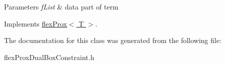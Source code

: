 \begin{DoxyParams}{Parameters}
{\em f\+List} & data part of term \\
\hline
\end{DoxyParams}


Implements \hyperlink{classflex_prox_aec433ffbf1a7586f26a2116c6b94bdd6}{flex\+Prox$<$ T $>$}.



The documentation for this class was generated from the following file\+:\begin{DoxyCompactItemize}
\item 
flex\+Prox\+Dual\+Box\+Constraint.\+h\end{DoxyCompactItemize}

